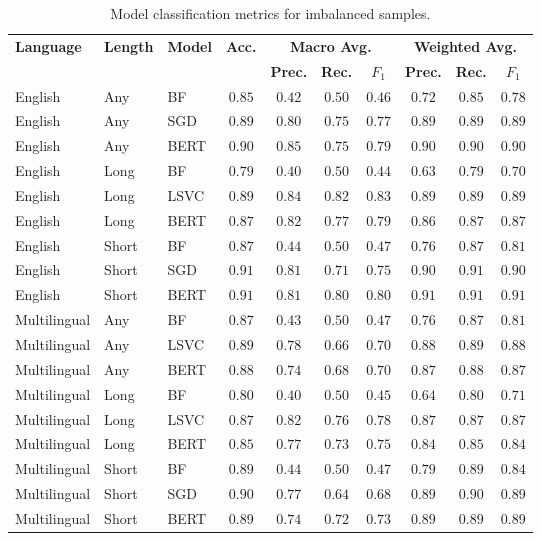 \begin{table}[ht]
    \centering
    \begin{tabular}{l l l | c | c c c | c c c}
        \toprule
        \multirow{2}{*}{\textbf{Language}}&\multirow{2}{*}{\textbf{Length}}&\multirow{2}{*}{\textbf{Model}}&\multirow{2}{*}{\textbf{Acc.}}&\multicolumn{3}{c}{\textbf{Macro Avg.}}&\multicolumn{3}{|c}{\textbf{Weighted Avg.}}\\
        &&&&\textbf{Prec.} & \textbf{Rec.} & \textbf{$F_1$} & \textbf{Prec.} & \textbf{Rec.} & \textbf{$F_1$}\\\midrule
        English&Any&BF&$0.85$&$0.42$&$0.50$&$0.46$&$0.72$&$0.85$&$0.78$\\
        English&Any&SGD&$0.89$&$0.80$&$0.75$&$0.77$&$0.89$&$0.89$&$0.89$\\  
        English&Any&BERT&$\mathbf{0.90}$&$0.85$&$0.75$&$\mathbf{0.79}$&$0.90$&$0.90$&$\mathbf{0.90}$\\\midrule  
        English&Long&BF&$0.79$&$0.40$&$0.50$&$0.44$&$0.63$&$0.79$&$0.70$\\  
        English&Long&LSVC&$\mathbf{0.89}$&$0.84$&$0.82$&$\mathbf{0.83}$&$0.89$&$0.89$&$\mathbf{0.89}$\\ 
        English&Long&BERT&$0.87$&$0.82$&$0.77$&$0.79$&$0.86$&$0.87$&$0.87$\\ \midrule
        English&Short&BF&$0.87$&$0.44$&$0.50$&$0.47$&$0.76$&$0.87$&$0.81$\\ 
        English&Short&SGD&$0.91$&$0.81$&$0.71$&$0.75$&$0.90$&$0.91$&$0.90$\\
        English&Short&BERT&$\mathbf{0.91}$&$0.81$&$0.80$&$\mathbf{0.80}$&$0.91$&$0.91$&$\mathbf{0.91}$\\\midrule
        Multilingual&Any&BF&$0.87$&$0.43$&$0.50$&$0.47$&$0.76$&$0.87$&$0.81$\\
        Multilingual&Any&LSVC&$\mathbf{0.89}$&$0.78$&$0.66$&$\mathbf{0.70}$&$0.88$&$0.89$&$\mathbf{0.88}$\\
        Multilingual&Any&BERT&$0.88$&$0.74$&$0.68$&$0.70$&$0.87$&$0.88$&$0.87$\\\midrule
        Multilingual&Long&BF&$0.80$&$0.40$&$0.50$&$0.45$&$0.64$&$0.80$&$0.71$\\
        Multilingual&Long&LSVC&$\mathbf{0.87}$&$0.82$&$0.76$&$\mathbf{0.78}$&$0.87$&$0.87$&$\mathbf{0.87}$\\
        Multilingual&Long&BERT&$0.85$&$0.77$&$0.73$&$0.75$&$0.84$&$0.85$&$0.84$\\\midrule
        Multilingual&Short&BF&$0.89$&$0.44$&$0.50$&$0.47$&$0.79$&$0.89$&$0.84$\\
        Multilingual&Short&SGD&$\mathbf{0.90}$&$0.77$&$0.64$&$0.68$&$0.89$&$0.90$&$\mathbf{0.89}$\\
        Multilingual&Short&BERT&$0.89$&$0.74$&$0.72$&$\mathbf{0.73}$&$0.89$&$0.89$&$0.89$\\
        \bottomrule
    \end{tabular}
    \caption{Model classification metrics for imbalanced samples.}
    \label{tab:Res_RF_Pol_MetricImb}
\end{table}

